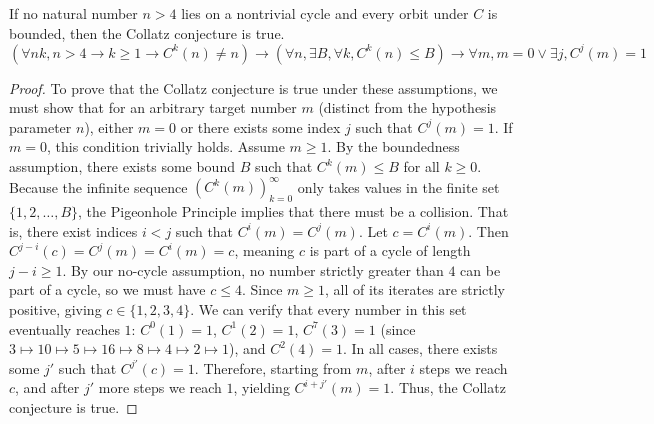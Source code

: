 \begin{lemma}\label{lemma:bounded_no_cycle_implies_collatz}\leanok
If no natural number $n > 4$ lies on a nontrivial cycle and every orbit under $C$ is bounded, then
the Collatz conjecture is true.
$$ \left( \forall n k, n > 4 \to k \ge 1 \to C^k(n) \neq n \right) \to \left( \forall n, \exists B, \forall k, C^k(n) \le B \right) \to \forall m, m = 0 \lor \exists j, C^j(m) = 1 $$
\end{lemma}
\begin{proof}\leanok
To prove that the Collatz conjecture is true under these assumptions, we must show that for an
arbitrary target number $m$ (distinct from the hypothesis parameter $n$), either $m = 0$ or there exists some index $j$ such that $C^j(m) = 1$.
If $m = 0$, this condition trivially holds.
Assume $m \ge 1$. By the boundedness assumption, there exists some bound $B$ such that $C^k(m) \le B$ for all $k \ge 0$.
Because the infinite sequence $(C^k(m))_{k=0}^\infty$ only takes values in the finite set $\{1, 2, \ldots, B\}$, the Pigeonhole Principle implies that there must be a collision.
That is, there exist indices $i < j$ such that $C^i(m) = C^j(m)$. Let $c = C^i(m)$.
Then $C^{j-i}(c) = C^j(m) = C^i(m) = c$, meaning $c$ is part of a cycle of length $j-i \ge 1$.
By our no-cycle assumption, no number strictly greater than $4$ can be part of a cycle, so we must have $c \le 4$.
Since $m \ge 1$, all of its iterates are strictly positive, giving $c \in \{1, 2, 3, 4\}$.
We can verify that every number in this set eventually reaches $1$:
$C^0(1) = 1$, $C^1(2) = 1$, $C^7(3) = 1$ (since $3 \mapsto 10 \mapsto 5 \mapsto 16 \mapsto 8 \mapsto 4 \mapsto 2 \mapsto 1$), and $C^2(4) = 1$.
In all cases, there exists some $j'$ such that $C^{j'}(c) = 1$.
Therefore, starting from $m$, after $i$ steps we reach $c$, and after $j'$ more steps we reach $1$, yielding $C^{i+j'}(m) = 1$.
Thus, the Collatz conjecture is true.
\end{proof}
